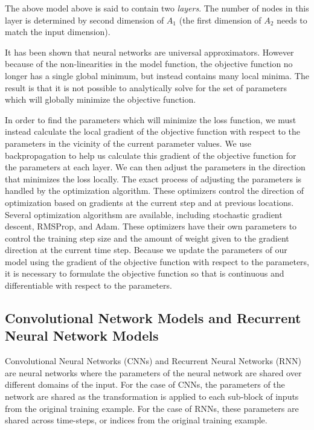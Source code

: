 {The above model above is said to contain two \textit{layers}. The number of nodes in this layer is determined by second dimension of $A_1$ (the first dimension of $A_2$ needs to match the input dimension).

It has been shown that neural networks are universal approximators\cite{Kolmogorov:57,hornik1989}. However because of the non-linearities in the model function, the objective function no longer has a single global minimum, but instead contains many local minima. The result is that it is not possible to analytically solve for the set of parameters which will globally minimize the objective function.

In order to find the parameters which will minimize the loss function, we must instead calculate the local gradient of the objective function with respect to the parameters in the vicinity of the current parameter values. We use backpropagation\cite{lecun_efficient_backprop} to help us calculate this gradient of the objective function for the parameters at each layer. We can then adjust the parameters in the direction that minimizes the loss locally.
The exact process of adjusting the parameters is handled by the optimization algorithm. These optimizers control the direction of optimization based on gradients at the current step and at previous locations. Several optimization algorithsm are available, including stochastic gradient descent, RMSProp\cite{Tieleman2012}, and Adam\cite{Kingma_adam_optimizer}.
These optimizers have their own parameters to control the training step size and the amount of weight given to the gradient direction at the current time step.
Because we update the parameters of our model using the gradient of the objective function with respect to the parameters, it is necessary to formulate the objective function so that is continuous and differentiable with respect to the parameters.

\subsection{Convolutional Network Models and Recurrent Neural Network Models}

Convolutional Neural Networks (CNNs)\cite{fukushima:1980,lecun1990handwritten} and Recurrent Neural Networks (RNN)\cite{rumelhart1986learning} are neural networks where the parameters of the neural network are shared over different domains of the input. For the case of CNNs, the parameters of the network are shared as the transformation is applied to each sub-block of inputs from the original training example. For the case of RNNs, these parameters are shared across time-steps, or indices from the original training example.

}
